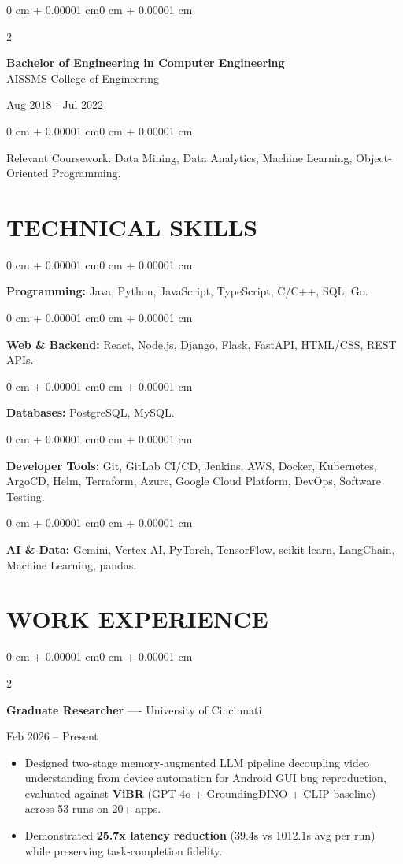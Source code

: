 \documentclass[10pt, letterpaper]{article}
\newenvironment{highlights}{
    \begin{itemize}[
        topsep=0.10 cm,
        parsep=0.06 cm,
        partopsep=0pt,
        itemsep=0.06 cm,
        leftmargin=12pt
    ]
}{
    \end{itemize}
}
\newenvironment{onecolentry}{
    \begin{adjustwidth}{0 cm + 0.00001 cm}{0 cm + 0.00001 cm}
}{
    \end{adjustwidth}
}
\newenvironment{twocolentry}[2][]{
    \onecolentry
    \def\secondColumn{#2}
    \setcolumnwidth{\fill, 4.5 cm}
    \begin{paracol}{2}
}{
    \switchcolumn \raggedleft \secondColumn
    \end{paracol}
    \endonecolentry
}
\begin{document}
\begin{twocolentry}{
    Aug 2018 - Jul 2022
}
    \textbf{Bachelor of Engineering in Computer Engineering} \\
    AISSMS College of Engineering
\end{twocolentry}
\begin{onecolentry}
Relevant Coursework: Data Mining, Data Analytics, Machine Learning, Object-Oriented Programming.
\end{onecolentry}
\section{TECHNICAL SKILLS}
\begin{onecolentry}
\textbf{Programming:} Java, Python, JavaScript, TypeScript, C/C++, SQL, Go.
\end{onecolentry}
\vspace{0.06 cm}
\begin{onecolentry}
\textbf{Web \& Backend:} React, Node.js, Django, Flask, FastAPI, HTML/CSS, REST APIs.
\end{onecolentry}
\vspace{0.06 cm}
\begin{onecolentry}
\textbf{Databases:} PostgreSQL, MySQL.
\end{onecolentry}
\vspace{0.06 cm}
\begin{onecolentry}
\textbf{Developer Tools:} Git, GitLab CI/CD, Jenkins, AWS, Docker, Kubernetes, ArgoCD, Helm, Terraform, Azure, Google Cloud Platform, DevOps, Software Testing.
\end{onecolentry}
\vspace{0.06 cm}
\begin{onecolentry}
\textbf{AI \& Data:} Gemini, Vertex AI, PyTorch, TensorFlow, scikit-learn, LangChain, Machine Learning, pandas.
\end{onecolentry}

\section{WORK EXPERIENCE}
\begin{twocolentry}{Feb 2026 -- Present}
\textbf{Graduate Researcher} ---- University of Cincinnati
\end{twocolentry}
\begin{highlights}
  \item Designed two-stage memory-augmented LLM pipeline decoupling video understanding from device automation for Android GUI bug reproduction, evaluated against \textbf{ViBR} (GPT-4o + GroundingDINO + CLIP baseline) across 53 runs on 20+ apps.
  \item Demonstrated \textbf{25.7x latency reduction} (39.4s vs 1012.1s avg per run) while preserving task-completion fidelity.
\end{highlights}
\end{document}
